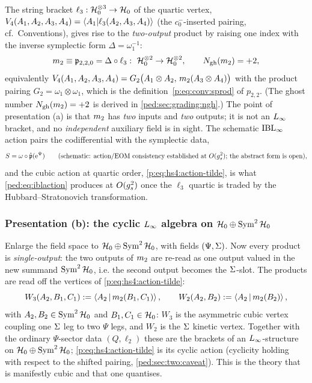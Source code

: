 The string bracket $\ell_3:\mathcal{H}_0^{\otimes3}\to\mathcal{H}_0$ of the quartic
vertex, $V_4(A_1,A_2,A_3,A_4)=\left \langle A_1|\ell_3(A_2,A_3,A_4) \right \rangle$ (the $c_0^-$-inserted
pairing, cf.\ Conventions), gives rise to the
\emph{two-output} product by raising one index with the inverse symplectic form
$\Delta=\omega_1^{-1}$:
\begin{equation}
	m_2\equiv\mathfrak p_{2,2,0}=\Delta\circ\ell_3:\ \mathcal{H}_0^{\otimes2}\to\mathcal{H}_0^{\otimes2},
	\qquad N_{\text{gh}}(m_2)=+2,
	\label{ped:eq:mtwo}
\end{equation}
equivalently $V_4(A_1,A_2,A_3,A_4)=G_2\big(A_1\otimes A_2,\,m_2(A_3\otimes A_4)\big)$ with
the product pairing $G_2=\omega_1\otimes\omega_1$, which is the definition~\eqref{p:eq:conv:sprod} of $p_{2,2}$. (The ghost number $N_{\text{gh}}(m_2)=+2$ is derived in \cref{ped:sec:grading:ngh}.) The point of presentation (a) is that $m_2$ has \emph{two} inputs and
\emph{two} outputs; it is not an $L_\infty$ bracket, and no \emph{independent} auxiliary field
is in sight. The schematic $\mathrm{IBL}_\infty$ action pairs the
codifferential with the symplectic data,
\begin{equation}
	S=\omega\circ\hat{\mathfrak p}(\mathrm{e}^\Psi)
	\qquad\text{(schematic: action/EOM consistency established at $O(g_s^2)$;
	the abstract form is open)},
	\label{ped:eq:iblaction}
\end{equation}
and the cubic action at quartic order, \eqref{p:eq:hs4:action-tilde}, is what \eqref{ped:eq:iblaction} produces at $O(g_s^2)$ once the $\ell_3$
quartic is traded by the Hubbard--Stratonovich transformation.

\subsubsection{Presentation (b): the cyclic \texorpdfstring{$L_\infty$}{L} algebra on
\texorpdfstring{$\mathcal{H}_0\oplus\operatorname{Sym}^2\mathcal{H}_0$}{the enlarged space}}
\label{ped:sec:two:loo}

Enlarge the field space to $\mathcal{H}_0\oplus\operatorname{Sym}^2\mathcal{H}_0$, with fields $(\Psi,\Sigma)$. Now every
product is \emph{single-output}: the two outputs of $m_2$ are re-read as one output valued
in the new summand $\operatorname{Sym}^2\mathcal{H}_0$, i.e. the second output becomes the $\Sigma$-slot. The
products are read off the vertices of \eqref{p:eq:hs4:action-tilde}:
\begin{equation}
	W_3(A_2,B_1,C_1):=\left \langle A_2\,|\,m_2(B_1,C_1) \right \rangle,\qquad
	W_2(A_2,B_2):=\left \langle A_2\,|\,m_2(B_2) \right \rangle,
	\label{ped:eq:W3W2}
\end{equation}
with $A_2,B_2\in\operatorname{Sym}^2\mathcal{H}_0$ and $B_1,C_1\in\mathcal{H}_0$: $W_3$ is the asymmetric cubic vertex
coupling one $\Sigma$ leg to two $\Psi$ legs, and $W_2$ is the $\Sigma$ kinetic vertex. Together
with the ordinary $\Psi$-sector data $(Q,\ell_2)$ these are the brackets of an
$L_\infty$-structure on $\mathcal{H}_0\oplus\operatorname{Sym}^2\mathcal{H}_0$; \eqref{p:eq:hs4:action-tilde} is its cyclic action
(cyclicity holding with respect to the shifted pairing, \cref{ped:sec:two:caveat}). This
is the theory that is manifestly cubic and that one quantises.

